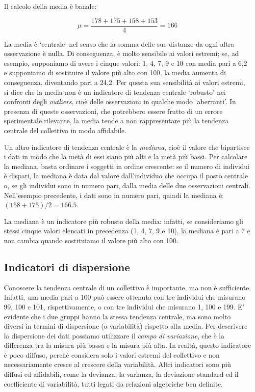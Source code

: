 \documentclass[a4paper,12pt,oneside]{book}
\begin{document}
Il calcolo della media è banale:

\[\mu = \frac{178 + 175 + 158 + 153}{4} = 166\]

La media è `centrale' nel senso che la somma delle sue distanze da ogni altra osservazione è nulla. Di conseguenza, è molto sensibile ai valori estremi; se, ad esempio, supponiamo di avere i cinque valori: 1, 4, 7, 9 e 10 con media pari a 6,2 e supponiamo di sostituire il valore più alto con 100, la media aumenta di conseguenza, diventando pari a 24,2. Per questa sua sensibilità ai valori estremi, si dice che la media non è un indicatore di tendenza centrale `robusto' nei confronti degli \emph{outliers}, cioè delle osservazioni in qualche modo `aberranti'. In presenza di queste osservazioni, che potrebbero essere frutto di un errore sperimentale rilevante, la media tende a non rappresentare più la tendenza centrale del collettivo in modo affidabile.

Un altro indicatore di tendenza centrale è la \emph{mediana}, cioè il valore che bipartisce i dati in modo che la metà di essi siano più alti e la metà più bassi. Per calcolare la mediana, basta ordinare i soggetti in ordine crescente: se il numero di individui è dispari, la mediana è data dal valore dall'individuo che occupa il posto centrale o, se gli individui sono in numero pari, dalla media delle due osservazioni centrali. Nell'esempio precedente, i dati sono in numero pari, quindi la mediana è: \((158 + 175)/2 = 166.5\).

La mediana è un indicatore più robusto della media: infatti, se consideriamo gli stessi cinque valori elencati in precedenza (1, 4, 7, 9 e 10), la mediana è pari a 7 e non cambia quando sostituiamo il valore più alto con 100.

\hypertarget{indicatori-di-dispersione}{%
\subsection{Indicatori di dispersione}\label{indicatori-di-dispersione}}

Conoscere la tendenza centrale di un collettivo è importante, ma non è sufficiente. Infatti, una media pari a 100 può essere ottenuta con tre individui che misurano 99, 100 e 101, rispettivamente, o con tre individui che misurano 1, 100 e 199. E' evidente che i due gruppi hanno la stessa tendenza centrale, ma sono molto diversi in termini di dispersione (o variabilità) rispetto alla media. Per descrivere la dispersione dei dati possiamo utilizzare il \emph{campo di variazione}, che è la differenza tra la misura più bassa e la misura più alta. In realtà, questo indicatore è poco diffuso, perché considera solo i valori estremi del collettivo e non necessariamente cresce al crescere della variabilità. Altri indicatori sono più diffusi ed affidabili, come la devianza, la varianza, la deviazione standard ed il coefficiente di variabilità, tutti legati da relazioni algebriche ben definite.
\end{document}
